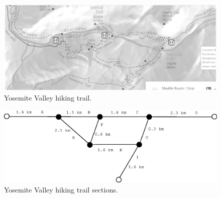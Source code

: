 \begin{figure}
\centering
\includegraphics[clip=true, viewport=0 280 625 600, width=5in]{Chapter_2_Figures/yosemite_trail.eps}
\caption{Yosemite Valley hiking trail.} 
\label{Figure: yosemite_trail.eps}
\end{figure}
\begin{figure}
\centering
\includegraphics[width=5in]{Chapter_2_Figures/yosemite_sections.eps}
\caption{Yosemite Valley hiking trail sections.}
\label{Figure: yosemite_sections.eps}
\end{figure}
\clearpage

